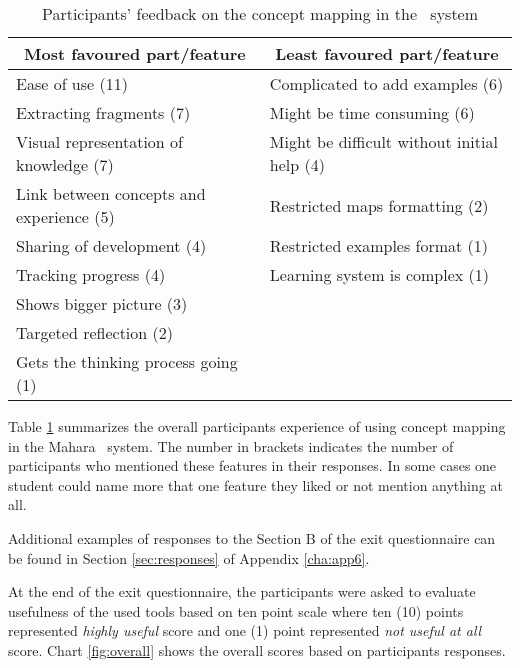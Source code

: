 \begin{table}[htb] \small
\setlength{\abovecaptionskip}{0pt}
  \caption{Participants' feedback on the concept mapping in the \ep~system }
  \begin{center}
    \begin{tabular}{| p{6.5cm} | p{6.5cm} |}
    \hline
     \multicolumn{1}{|c|}{\textbf{Most favoured part/feature}} &
     \multicolumn{1}{c|}{\textbf{Least favoured part/feature}} \\
     \hline
     Ease of use (11) & Complicated to add examples (6) \\ \hline
     Extracting fragments (7) & Might be time consuming (6) \\ \hline
     Visual representation of knowledge (7) & Might be difficult without initial help (4) \\ \hline
     Link between concepts and experience (5) & Restricted maps formatting (2) \\ \hline 
     Sharing of development (4) & Restricted examples format (1) \\ \hline
     Tracking progress (4) & Learning system is complex (1) \\ \hline
     Shows bigger picture (3) &  \\ \hline
     Targeted reflection (2) & \\ \hline
     Gets the thinking process going (1) & \\ \hline
    \end{tabular}
  \end{center}
  \label{tab:study2summary}
\end{table}

Table \ref{tab:study2summary} summarizes the overall participants experience of
using concept mapping in the Mahara \ep~system. The number in brackets indicates
the number of participants who mentioned these features in their responses. In
some cases one student could name more that one feature they liked or not
mention anything at all.

Additional examples of responses to the Section B of the exit questionnaire can
be found in Section \ref{sec:responses} of Appendix \ref{cha:app6}.

At the end of the exit questionnaire, the participants were asked to evaluate
usefulness of the used tools based on ten point scale where ten (10) points
represented \textit{highly useful} score and one (1) point represented
\textit{not useful at all} score. Chart \ref{fig:overall} shows the overall
scores based on participants responses.

